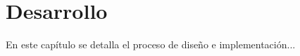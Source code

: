 \chapter{Desarrollo}
\label{ch:desarrollo}

En este capítulo se detalla el proceso de diseño e implementación...
